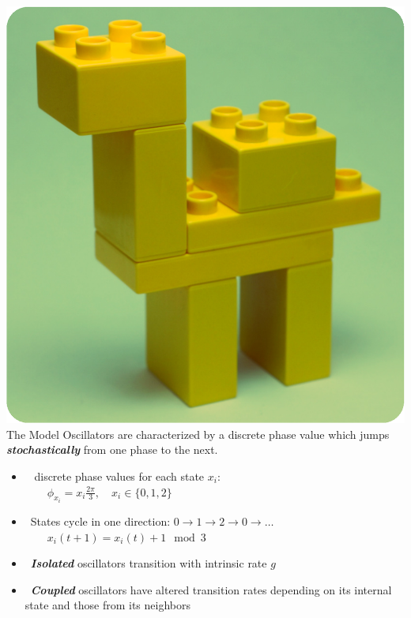 \documentclass[serif,mathserif]{beamer}
\begin{document}
\begin{frame}{\includegraphics[height=0.06\textheight]{lego-model.eps}\hspace{0.25cm} The Model}
    Oscillators are characterized by a discrete phase value which jumps \textbf{\textit{stochastically}} from one phase to the next.
    \begin{itemize}
        \vspace{0.25cm}
        \item \  discrete phase values for each state $x_i$: \\
        $\qquad \phi_{x_i} = x_i\frac{2\pi}{3}, \quad x_i \in \{0,1,2\}$
        \vspace{0.25cm}
        \item \ \pause States cycle in one direction: $0 \rightarrow 1 \rightarrow 2 \rightarrow 0 \rightarrow \dots$ \\
            $\qquad x_i(t+1) = x_i(t) + 1 \mod 3$
        \vspace{0.25cm}
        \item \ \pause \textbf{\textit{Isolated}} oscillators transition with intrinsic rate $g$
        \vspace{0.25cm}
        \item \ \pause \textbf{\textit{Coupled}} oscillators have altered transition rates depending on its internal state and those from its neighbors
    \end{itemize}
\end{frame}
\end{document}

